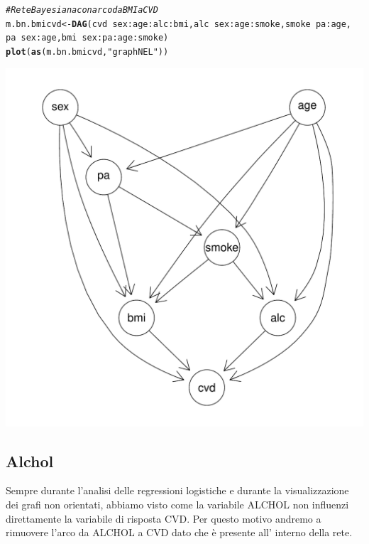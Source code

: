 \documentclass{article}\usepackage[]{graphicx}\usepackage[]{xcolor}
\makeatletter
\def\maxwidth{ %
  \ifdim\Gin@nat@width>\linewidth
    \linewidth
  \else
    \Gin@nat@width
  \fi
}
\newcommand{\hlstr}[1]{\textcolor[rgb]{0.192,0.494,0.8}{#1}}%
\newcommand{\hlcom}[1]{\textcolor[rgb]{0.678,0.584,0.686}{\textit{#1}}}%
\newcommand{\hlopt}[1]{\textcolor[rgb]{0,0,0}{#1}}%
\newcommand{\hlstd}[1]{\textcolor[rgb]{0.345,0.345,0.345}{#1}}%
\newcommand{\hlkwb}[1]{\textcolor[rgb]{0.69,0.353,0.396}{#1}}%
\newcommand{\hlkwd}[1]{\textcolor[rgb]{0.737,0.353,0.396}{\textbf{#1}}}%
\newenvironment{kframe}{%
 \def\at@end@of@kframe{}%
 \ifinner\ifhmode%
  \def\at@end@of@kframe{\end{minipage}}%
  \begin{minipage}{\columnwidth}%
 \fi\fi%
 \def\FrameCommand##1{\hskip\@totalleftmargin \hskip-\fboxsep
 \colorbox{shadecolor}{##1}\hskip-\fboxsep
     \hskip-\linewidth \hskip-\@totalleftmargin \hskip\columnwidth}%
 \MakeFramed {\advance\hsize-\width
   \@totalleftmargin\z@ \linewidth\hsize
   \@setminipage}}%
 {\par\unskip\endMakeFramed%
 \at@end@of@kframe}
\newenvironment{knitrout}{}{} %
\makeatother
\begin{document}
\begin{knitrout}
\color{fgcolor}\begin{kframe}
\begin{alltt}
\hlcom{#Rete Bayesiana con arco da BMI a CVD}
\hlstd{m.bn.bmicvd} \hlkwb{<-} \hlkwd{DAG}\hlstd{(cvd}\hlopt{~}\hlstd{sex}\hlopt{:}\hlstd{age}\hlopt{:}\hlstd{alc}\hlopt{:}\hlstd{bmi,alc}\hlopt{~}\hlstd{sex}\hlopt{:}\hlstd{age}\hlopt{:}\hlstd{smoke,smoke}\hlopt{~}\hlstd{pa}\hlopt{:}\hlstd{age,}
                   \hlstd{pa}\hlopt{~}\hlstd{sex}\hlopt{:}\hlstd{age, bmi}\hlopt{~}\hlstd{sex}\hlopt{:}\hlstd{pa}\hlopt{:}\hlstd{age}\hlopt{:}\hlstd{smoke)}
\hlkwd{plot}\hlstd{(}\hlkwd{as}\hlstd{(m.bn.bmicvd,} \hlstr{"graphNEL"}\hlstd{))}
\end{alltt}
\end{kframe}
\includegraphics[width=\maxwidth]{figure/Rete_Bayesiana_con_arco_BMI_-__CVD-1} 
\end{knitrout}
    
  \subsection{Alchol}
    Sempre durante l'analisi delle regressioni logistiche e durante la 
    visualizzazione dei grafi non orientati, abbiamo visto come la variabile 
    ALCHOL non influenzi direttamente la variabile di risposta CVD. Per questo
    motivo andremo a rimuovere l'arco da ALCHOL a CVD dato che è presente all'
    interno della rete.
    
\end{document}

